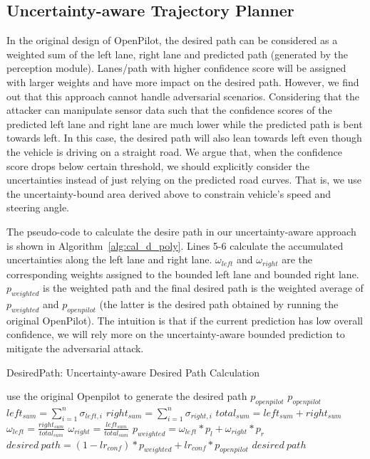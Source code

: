 \subsection{Uncertainty-aware Trajectory Planner}
In the original design of OpenPilot, the desired path can be considered as a weighted sum of the left lane, right lane and predicted path (generated by the perception module). Lanes/path with higher confidence score will be assigned with larger weights and have more impact on the desired path. However, we find out that this approach cannot handle adversarial scenarios. Considering that the attacker can manipulate sensor data such that the confidence scores of the predicted left lane and right lane are much lower while the predicted path is bent towards left. In this case, the desired path will also lean towards left even though the vehicle is driving on a straight road. We argue that, when the confidence score drops below certain threshold, we should explicitly consider the uncertainties instead of just relying on the predicted road curves. That is, we use the uncertainty-bound area derived above to constrain vehicle's speed and steering angle.


The pseudo-code to calculate the desire path in our uncertainty-aware approach is shown in  Algorithm~\ref{alg:cal_d_poly}. Lines 5-6 calculate the accumulated uncertainties along the left lane and right lane. $\omega_{left}$ and $\omega_{right}$ are the corresponding weights assigned to the bounded left lane and bounded right lane. $p_{weighted}$ is the weighted path and the final desired path is the weighted average of $p_{weighted}$ and $p_{openpilot}$ (the latter is the desired path obtained by running the original OpenPilot). The intuition is that if the current prediction has low overall confidence, we will rely more on the uncertainty-aware bounded prediction to mitigate the adversarial attack.
\begin{algorithm}[!h]
\caption{DesiredPath: Uncertainty-aware Desired Path Calculation}
\label{alg:cal_d_poly}
\begin{algorithmic}[1]
\REQUIRE {}
    \STATE use the original Openpilot to generate the desired path $p_{openpilot}$
    \RETURN $p_{openpilot}$
\ELSE
    \STATE $left_{sum} = \sum_{i=1}^{n}\sigma_{left,i}$ 
    \STATE $right_{sum} = \sum_{i=1}^{n}\sigma_{right,i}$ 
    \STATE $total_{sum} = left_{sum}+right_{sum}$
    \STATE $\omega_{left} = \frac{right_{sum}}{total_{sum}}$
    \STATE $\omega_{right} = \frac{left_{sum}}{total_{sum}}$
    \STATE $p_{weighted} = \omega_{left}*p_{l}+\omega_{right}*p_{r}$
    \STATE $desired\ path = (1-lr_{conf})*p_{weighted}+lr_{conf}*p_{openpilot}$ 
\ENDIF
\RETURN $desired\ path$
\end{algorithmic}
\end{algorithm}

